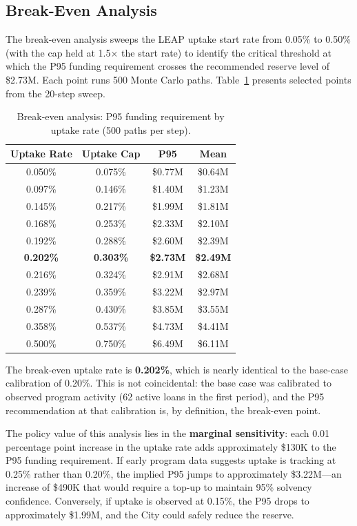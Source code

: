 \documentclass[11pt, letterpaper]{article}
\begin{document}
\subsection{Break-Even Analysis}

The break-even analysis sweeps the LEAP uptake start rate from 0.05\% to 0.50\% (with the cap held at 1.5$\times$ the start rate) to identify the critical threshold at which the P95 funding requirement crosses the recommended reserve level of \$2.73M. Each point runs 500 Monte Carlo paths. Table~\ref{tab:breakeven} presents selected points from the 20-step sweep.

\begin{table}[H]
  \centering
  \caption{Break-even analysis: P95 funding requirement by uptake rate (500 paths per step).}
  \label{tab:breakeven}
  \begin{tabular}{@{}cccc@{}}
    \toprule
    \textbf{Uptake Rate} & \textbf{Uptake Cap} & \textbf{P95} & \textbf{Mean} \\
    \midrule
    0.050\% & 0.075\% & \$0.77M & \$0.64M \\
    0.097\% & 0.146\% & \$1.40M & \$1.23M \\
    0.145\% & 0.217\% & \$1.99M & \$1.81M \\
    0.168\% & 0.253\% & \$2.33M & \$2.10M \\
    0.192\% & 0.288\% & \$2.60M & \$2.39M \\
    \textbf{0.202\%} & \textbf{0.303\%} & \textbf{\$2.73M} & \textbf{\$2.49M} \\
    0.216\% & 0.324\% & \$2.91M & \$2.68M \\
    0.239\% & 0.359\% & \$3.22M & \$2.97M \\
    0.287\% & 0.430\% & \$3.85M & \$3.55M \\
    0.358\% & 0.537\% & \$4.73M & \$4.41M \\
    0.500\% & 0.750\% & \$6.49M & \$6.11M \\
    \bottomrule
  \end{tabular}
\end{table}

The break-even uptake rate is \textbf{0.202\%}, which is nearly identical to the base-case calibration of 0.20\%. This is not coincidental: the base case was calibrated to observed program activity (62 active loans in the first period), and the P95 recommendation at that calibration is, by definition, the break-even point.

The policy value of this analysis lies in the \textbf{marginal sensitivity}: each 0.01 percentage point increase in the uptake rate adds approximately \$130K to the P95 funding requirement. If early program data suggests uptake is tracking at 0.25\% rather than 0.20\%, the implied P95 jumps to approximately \$3.22M---an increase of \$490K that would require a top-up to maintain 95\% solvency confidence. Conversely, if uptake is observed at 0.15\%, the P95 drops to approximately \$1.99M, and the City could safely reduce the reserve.
\end{document}
